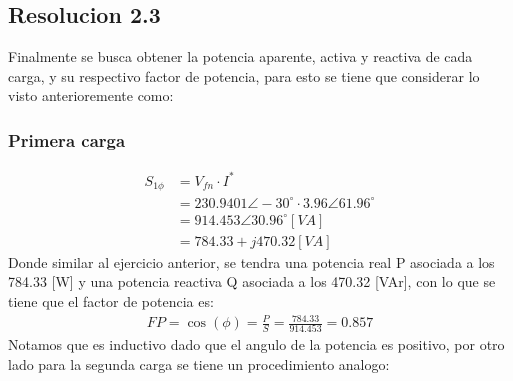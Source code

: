 \documentclass[
  11pt,
  letterpaper,
   addpoints,
   answers
  ]{exam}
\begin{document}
\begin{questions}
\begin{solution}
\subsection*{Resolucion 2.3}
Finalmente se busca obtener la potencia aparente, activa y reactiva de cada carga, y su respectivo factor de potencia, para esto se tiene que considerar lo visto anterioremente como:
\subsubsection*{Primera carga}
\begin{align}
    S_{1\phi} &= V_{fn} \cdot I^{*}\\
    &= 230.9401 \angle -30^{\circ} \cdot 3.96 \angle 61.96^{\circ}\\
    &= 914.453 \angle 30.96^{\circ} [VA]\\
    &= 784.33 + j470.32 [VA]
\end{align}
Donde similar al ejercicio anterior, se tendra una potencia real P asociada a los 784.33 [W] y una potencia reactiva Q asociada a los 470.32 [VAr], con lo que se tiene que el factor de potencia es:
\begin{align}
    FP = \cos(\phi) = \frac{P}{S} = \frac{784.33}{914.453} = 0.857
\end{align}
Notamos que es inductivo dado que el angulo de la potencia es positivo, por otro lado para la segunda carga se tiene un procedimiento analogo:

\end{solution}
\end{questions}
\end{document}
